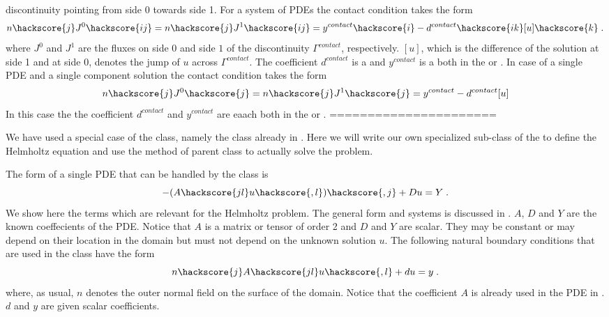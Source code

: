 discontinuity pointing from side 0 towards side 1. For a system of PDEs
the contact condition takes the form
\begin{equation}\label{LINEARPDE.SYSTEM.6}
n\hackscore{j} J^{0}\hackscore{ij}=n\hackscore{j} J^{1}\hackscore{ij}=y^{contact}\hackscore{i} - d^{contact}\hackscore{ik} [u]\hackscore{k} \; .
\end{equation}
where $J^{0}$ and $J^{1}$ are the fluxes on side $0$ and side $1$ of the
discontinuity $\Gamma^{contact}$, respectively. $[u]$, which is the difference
of the solution at side 1 and at side 0, denotes the jump of $u$ across $\Gamma^{contact}$.
The coefficient $d^{contact}$ is a \RankTwo and $y^{contact}$ is a  
\RankOne both in the \FunctionOnContactZero or \FunctionOnContactOne.
In case of a single PDE and a single component solution the contact condition takes the form
\begin{equation}\label{LINEARPDE.SINGLE.6}
n\hackscore{j} J^{0}\hackscore{j}=n\hackscore{j} J^{1}\hackscore{j}=y^{contact} - d^{contact}[u]
\end{equation}
In this case the the coefficient $d^{contact}$ and $y^{contact}$ are eaach \Scalar
both in the \FunctionOnContactZero or \FunctionOnContactOne.
======================


We have used a special case of the \LinearPDE class, namely the
\Poisson class already in . 
Here we will write our own specialized sub-class of the \LinearPDE to define the Helmholtz equation
and use the  method of parent class to actually solve the problem.

The form of a single PDE that can be handled by the \LinearPDE class is 
\begin{equation}\label{EQU.FEM.1}
-(A\hackscore{jl} u\hackscore{,l})\hackscore{,j}+D u =Y \; .
\end{equation}
We show here the terms which are relevant for the Helmholtz problem. 
The general form and systems is discussed in .  
$A$, $D$ and $Y$ are the known coeffecients of the PDE.  
Notice that $A$ is a matrix or tensor of order 2 and $D$ and $Y$ are scalar. 
They may be constant or may depend on their 
location in the domain but must not depend on the unknown solution $u$. 
The following natural boundary conditions  that
are used in the \LinearPDE class have the form
\begin{equation}\label{EQU.FEM.2}
n\hackscore{j}A\hackscore{jl} u\hackscore{,l}+du=y  \;.
\end{equation}
where, as usual, $n$ denotes the outer normal field on the surface of the domain. Notice that 
the coefficient $A$ is already used in the PDE in . $d$ and $y$ are given scalar coefficients.

